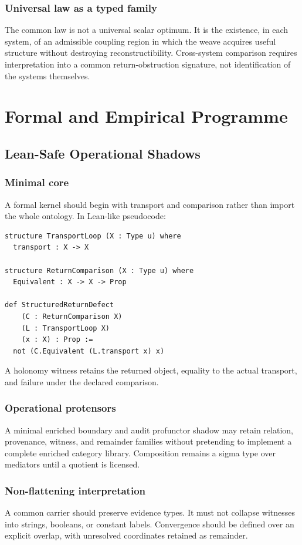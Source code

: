 \documentclass[12pt,openany]{book}
\theoremstyle{remark}
\begin{document}
\section{Universal law as a typed family}
The common law is not a universal scalar optimum. It is the existence, in each system, of an admissible coupling region in which the weave acquires useful structure without destroying reconstructibility. Cross-system comparison requires interpretation into a common return-obstruction signature, not identification of the systems themselves.

\part{Formal and Empirical Programme}

\chapter{Lean-Safe Operational Shadows}
\label{ch:lean}

\section{Minimal core}
A formal kernel should begin with transport and comparison rather than import the whole ontology. In Lean-like pseudocode:
\begin{verbatim}
structure TransportLoop (X : Type u) where
  transport : X -> X

structure ReturnComparison (X : Type u) where
  Equivalent : X -> X -> Prop

def StructuredReturnDefect
    (C : ReturnComparison X)
    (L : TransportLoop X)
    (x : X) : Prop :=
  not (C.Equivalent (L.transport x) x)
\end{verbatim}

A holonomy witness retains the returned object, equality to the actual transport, and failure under the declared comparison.

\section{Operational protensors}
A minimal enriched boundary and audit profunctor shadow may retain relation, provenance, witness, and remainder families without pretending to implement a complete enriched category library. Composition remains a sigma type over mediators until a quotient is licensed.

\section{Non-flattening interpretation}
A common carrier should preserve evidence types. It must not collapse witnesses into strings, booleans, or constant labels. Convergence should be defined over an explicit overlap, with unresolved coordinates retained as remainder.
\end{document}

